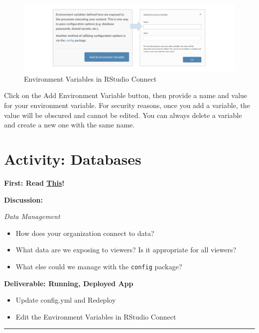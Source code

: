 \documentclass[]{book}
\providecommand{\tightlist}{%
  \setlength{\itemsep}{0pt}\setlength{\parskip}{0pt}}
\theoremstyle{definition}
\theoremstyle{definition}
\theoremstyle{definition}
\theoremstyle{remark}
\begin{document}
\begin{figure}
\centering
\includegraphics{imgs/databases/env-vars.png}
\caption{Environment Variables in RStudio Connect}
\end{figure}

Click on the Add Environment Variable button, then provide a name and
value for your environment variable. For security reasons, once you add
a variable, the value will be obscured and cannot be edited. You can
always delete a variable and create a new one with the same name.

\hypertarget{activity-databases}{%
\section{Activity: Databases}\label{activity-databases}}

\textbf{First: Read
\href{https://db.rstudio.com/best-practices/portable-code/}{This}!}

\textbf{Discussion:}

\emph{Data Management}

\begin{itemize}
\tightlist
\item
  How does your organization connect to data?
\item
  What data are we exposing to viewers? Is it appropriate for all
  viewers?
\item
  What else could we manage with the \texttt{config} package?
\end{itemize}

\textbf{Deliverable: Running, Deployed App}

\begin{itemize}
\tightlist
\item
  Update config.yml and Redeploy
\item
  Edit the Environment Variables in RStudio Connect
\end{itemize}

\begin{center}\rule{0.5\linewidth}{\linethickness}\end{center}
\end{document}
